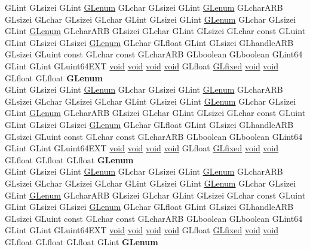 \begin{DoxyCompactItemize}
\begin{tabbing}
\>GLint GLsizei GLint \hyperlink{interfacevoid}{GLenum} GLchar GLsizei GLint \hyperlink{interfacevoid}{GLenum} GLcharARB GLsizei GLchar GLsizei GLchar GLint GLsizei GLint \hyperlink{interfacevoid}{GLenum} GLchar GLsizei GLint \hyperlink{interfacevoid}{GLenum} GLcharARB GLsizei GLchar GLint GLsizei GLchar const GLuint GLint GLsizei GLsizei \hyperlink{interfacevoid}{GLenum} GLchar GLfloat GLint GLsizei GLhandleARB GLsizei GLuint const GLchar const GLcharARB GLboolean GLboolean GLint64 GLint GLint GLuint64EXT \hyperlink{interfacevoid}{void} \hyperlink{interfacevoid}{void} \hyperlink{interfacevoid}{void} \hyperlink{interfacevoid}{void} GLfloat \hyperlink{glheader_8h_ad6d3fa892df40dedf48ee6d84529ae5e}{GLfixed} \hyperlink{interfacevoid}{void} \hyperlink{interfacevoid}{void} GLfloat GLfloat {\bfseries GLenum}\\
\>GLint GLsizei GLint \hyperlink{interfacevoid}{GLenum} GLchar GLsizei GLint \hyperlink{interfacevoid}{GLenum} GLcharARB GLsizei GLchar GLsizei GLchar GLint GLsizei GLint \hyperlink{interfacevoid}{GLenum} GLchar GLsizei GLint \hyperlink{interfacevoid}{GLenum} GLcharARB GLsizei GLchar GLint GLsizei GLchar const GLuint GLint GLsizei GLsizei \hyperlink{interfacevoid}{GLenum} GLchar GLfloat GLint GLsizei GLhandleARB GLsizei GLuint const GLchar const GLcharARB GLboolean GLboolean GLint64 GLint GLint GLuint64EXT \hyperlink{interfacevoid}{void} \hyperlink{interfacevoid}{void} \hyperlink{interfacevoid}{void} \hyperlink{interfacevoid}{void} GLfloat \hyperlink{glheader_8h_ad6d3fa892df40dedf48ee6d84529ae5e}{GLfixed} \hyperlink{interfacevoid}{void} \hyperlink{interfacevoid}{void} GLfloat GLfloat GLfloat {\bfseries GLenum}\\
\>GLint GLsizei GLint \hyperlink{interfacevoid}{GLenum} GLchar GLsizei GLint \hyperlink{interfacevoid}{GLenum} GLcharARB GLsizei GLchar GLsizei GLchar GLint GLsizei GLint \hyperlink{interfacevoid}{GLenum} GLchar GLsizei GLint \hyperlink{interfacevoid}{GLenum} GLcharARB GLsizei GLchar GLint GLsizei GLchar const GLuint GLint GLsizei GLsizei \hyperlink{interfacevoid}{GLenum} GLchar GLfloat GLint GLsizei GLhandleARB GLsizei GLuint const GLchar const GLcharARB GLboolean GLboolean GLint64 GLint GLint GLuint64EXT \hyperlink{interfacevoid}{void} \hyperlink{interfacevoid}{void} \hyperlink{interfacevoid}{void} \hyperlink{interfacevoid}{void} GLfloat \hyperlink{glheader_8h_ad6d3fa892df40dedf48ee6d84529ae5e}{GLfixed} \hyperlink{interfacevoid}{void} \hyperlink{interfacevoid}{void} GLfloat GLfloat GLfloat GLint {\bfseries GLenum}\\

\end{tabbing}
\end{DoxyCompactItemize}
